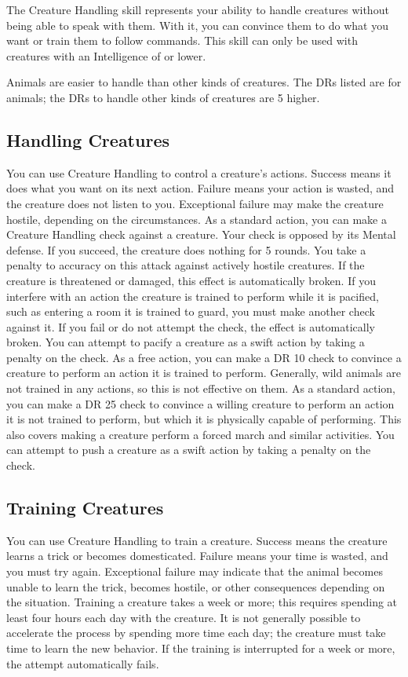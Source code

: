     The Creature Handling skill represents your ability to handle creatures without being able to speak with them. With it, you can convince them to do what you want or train them to follow commands. This skill can only be used with creatures with an Intelligence of  or lower.

        Animals are easier to handle than other kinds of creatures. The DRs listed are for animals; the DRs to handle other kinds of creatures are 5 higher.

    \subsection{Handling Creatures}
        You can use Creature Handling to control a creature's actions. Success means it does what you want on its next action. Failure means your action is wasted, and the creature does not listen to you. Exceptional failure may make the creature hostile, depending on the circumstances.
         As a standard action, you can make a Creature Handling check against a creature. Your check is opposed by its Mental defense. If you succeed, the creature does nothing for 5 rounds. You take a  penalty to accuracy on this attack against actively hostile creatures. If the creature is threatened or damaged, this effect is automatically broken. If you interfere with an action the creature is trained to perform while it is pacified, such as entering a room it is trained to guard, you must make another check against it. If you fail or do not attempt the check, the effect is automatically broken. You can attempt to pacify a creature as a swift action by taking a  penalty on the check.
         As a free action, you can make a DR 10 check to convince a creature to perform an action it is trained to perform. Generally, wild animals are not trained in any actions, so this is not effective on them.
         As a standard action, you can make a DR 25 check to convince a willing creature to perform an action it is not trained to perform, but which it is physically capable of performing. This also covers making a creature perform a forced march and similar activities. You can attempt to push a creature as a swift action by taking a  penalty on the check.

    \subsection{Training Creatures}
        You can use Creature Handling to train a creature. Success means the creature learns a trick or becomes domesticated. Failure means your time is wasted, and you must try again. Exceptional failure may indicate that the animal becomes unable to learn the trick, becomes hostile, or other consequences depending on the situation. Training a creature takes a week or more; this requires spending at least four hours each day with the creature. It is not generally possible to accelerate the process by spending more time each day; the creature must take time to learn the new behavior. If the training is interrupted for a week or more, the attempt automatically fails.

